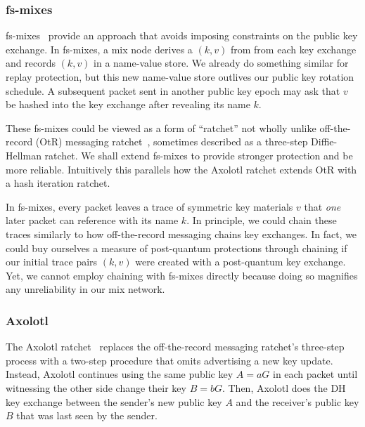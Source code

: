 \documentclass[twoside,letterpaper]{llncs}
\begin{document}
\subsubsection{fs-mixes}

fs-mixes~\cite{fs-mix} provide an approach that
avoids imposing constraints on the public key exchange.  In fs-mixes,
a mix node derives a $(k,v)$ from from each key exchange and records
$(k,v)$ in a name-value store.  We already do something similar for 
replay protection, but this new name-value store outlives our public
key rotation schedule.  A subsequent packet sent in another public
key epoch may ask that $v$ be hashed into the key exchange after
revealing its name $k$.  

These fs-mixes could be viewed as a form of ``ratchet'' not wholly
unlike off-the-record (OtR) messaging ratchet~\cite{OtR},
sometimes described as a three-step Diffie-Hellman ratchet.  
We shall extend fs-mixes to provide stronger protection and be more
reliable.  Intuitively this parallels how the Axolotl 
ratchet extends OtR with a hash iteration ratchet.

In fs-mixes, every packet leaves a trace of symmetric
key materials $v$ that {\it one} later packet can reference with its
name $k$.  In principle, we could chain these traces similarly to
how off-the-record messaging \cite{OtR} chains key exchanges.
In fact, we could buy ourselves a measure of post-quantum protections
through chaining if our initial trace pairs $(k,v)$ were created with
a post-quantum key exchange.  Yet, we cannot employ chaining with
fs-mixes directly because doing so magnifies any unreliability in
our mix network. 

\subsubsection{Axolotl}
\def\ck{\texttt{ck}}
\def\rk{\texttt{rk}}
\def\mk{\texttt{mk}}

The Axolotl ratchet~\cite{TextSecure} replaces the off-the-record
messaging ratchet's three-step process with a two-step procedure
that omits advertising a new key update.  Instead, Axolotl continues
using the same public key $A = a G$ in each packet until witnessing
the other side change their key $B = b G$.  Then, Axolotl does the DH key
exchange between the sender's new public key $A$ and the receiver's
public key $B$ that was last seen by the sender.
\end{document}
